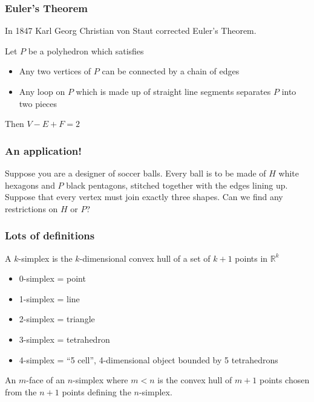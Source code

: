 \documentclass{beamer}
\begin{document}
\begin{frame}
    \frametitle{Euler's Theorem}
    In 1847 Karl Georg Christian von Staut corrected Euler's Theorem.
    \vspace*{\baselineskip}
    
    \begin{theorem}
        Let $P$ be a polyhedron which satisfies
        \begin{itemize}{}
            \item Any two vertices of $P$ can be connected by a chain of edges
            \item Any loop on $P$ which is made up of straight line segments separates $P$ into two pieces
        \end{itemize}
        Then $V - E + F = 2$
    \end{theorem}
\end{frame}

\begin{frame}
    \frametitle{An application!}
    Suppose you are a designer of soccer balls. Every ball is to be made of $H$ white hexagons and $P$ black pentagons, stitched together with the edges lining up. Suppose that every vertex must join exactly three shapes. Can we find any restrictions on $H$ or $P$?
\end{frame}

\begin{frame}
    \frametitle{Lots of definitions}
    \begin{definition}
        A $k$-simplex is the $k$-dimensional convex hull of a set of $k+1$ points in $\mathbb{R}^k$
        \begin{itemize}
            \item 0-simplex = point
            \item 1-simplex = line
            \item 2-simplex = triangle
            \item 3-simplex = tetrahedron
            \item 4-simplex = ``5 cell'', 4-dimensional object bounded by 5 tetrahedrons
        \end{itemize}
    \end{definition}
    \begin{definition}
        An $m$-face of an $n$-simplex where $m < n$ is the convex hull of $m+1$ points chosen from the $n+1$ points defining the $n$-simplex.
    \end{definition}
\end{frame}
\end{document}
